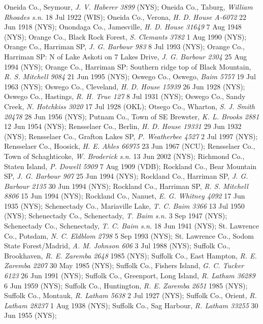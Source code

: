 \documentclass{article}
\begin{document}
Oneida Co., Seymour, \textit{J. V. Haberer 3899} (NYS);
Oneida Co., Taburg, \textit{William Rhoades s.n.} 18 Jul 1922 (WIS);
Oneida Co., Verona, \textit{H. D. House A-6072} 22 Jun 1918 (NYS);
Onondaga Co., Jamesville, \textit{H. D. House 31649} 7 Aug 1948 (NYS);
Orange Co., Black Rock Forest, \textit{S. Clemants 3782} 1 Aug 1990 (NYS);
Orange Co., Harriman SP, \textit{J. G. Barbour 983} 8 Jul 1993 (NYS);
Orange Co., Harriman SP: N of Lake Askoti on 7 Lakes Drive, \textit{J. G. Barbour 2304} 25 Aug 1994 (NYS);
Orange Co., Harriman SP: Southern ridge top of Black Mountain, \textit{R. S. Mitchell 9084} 21 Jun 1995 (NYS);
Oswego Co., Oswego, \textit{Baim 5757} 19 Jul 1963 (NYS);
Oswego Co., Cleveland, \textit{H. D. House 15939} 26 Jun 1928 (NYS);
Oswego Co., Hastings, \textit{R. H. True 127} 8 Jul 1931 (NYS);
Oswego Co., Sandy Creek, \textit{N. Hotchkiss 3020} 17 Jul 1928 (OKL);
Otsego Co., Wharton, \textit{S. J. Smith 20478} 28 Jun 1956 (NYS);
Putnam Co., Town of SE Brewster, \textit{K. L. Brooks 2881} 12 Jun 1954 (NYS);
Rensselaer Co., Berlin, \textit{H. D. House 19331} 29 Jun 1932 (NYS);
Rensselaer Co., Grafton Lakes SP, \textit{P. Weatherbee 4527} 2 Jul 1997 (NYS);
Rensselaer Co., Hoosick, \textit{H. E. Ahles 66975} 23 Jun 1967 (NCU);
Rensselaer Co., Town of Schaghticoke, \textit{W. Broderick s.n.} 13 Jun 2002 (NYS);
Richmond Co., Staten Island, \textit{P. Dowell 5909} 7 Aug 1909 (VDB);
Rockland Co., Bear Mountain SP, \textit{J. G. Barbour 907} 25 Jun 1994 (NYS);
Rockland Co., Harriman SP, \textit{J. G. Barbour 2135} 30 Jun 1994 (NYS);
Rockland Co., Harriman SP, \textit{R. S. Mitchell 8806} 15 Jun 1994 (NYS);
Rockland Co., Nanuet, \textit{E. G. Whitney 4092} 17 Jun 1935 (NYS);
Schenectady Co., Mariaville Lake, \textit{T. C. Baim 3366} 13 Jul 1950 (NYS);
Schenectady Co., Schenectady, \textit{T. Baim s.n.} 3 Sep 1947 (NYS);
Schenectady Co., Schenectady, \textit{T. C. Baim s.n.} 18 Jun 1941 (NYS);
St. Lawrence Co., Potsdam, \textit{N. C. Eldblom 2798} 5 Sep 1993 (NYS);
St. Lawrence Co., Sodom State Forest/Madrid, \textit{A. M. Johnson 606} 3 Jul 1988 (NYS);
Suffolk Co., Brookhaven, \textit{R. E. Zaremba 2648} 1985 (NYS);
Suffolk Co., East Hampton, \textit{R. E. Zaremba 2207} 30 May 1985 (NYS);
Suffolk Co., Fishers Island, \textit{G. C. Tucker 6123} 26 Jun 1991 (NYS);
Suffolk Co., Greenport, Long Island, \textit{R. Latham 36289} 6 Jun 1959 (NYS);
Suffolk Co., Huntington, \textit{R. E. Zaremba 2651} 1985 (NYS);
Suffolk Co., Montauk, \textit{R. Latham 5638} 2 Jul 1927 (NYS);
Suffolk Co., Orient, \textit{R. Latham 28237} 1 Aug 1938 (NYS);
Suffolk Co., Sag Harbour, \textit{R. Latham 33255} 30 Jun 1955 (NYS);
\end{document}
